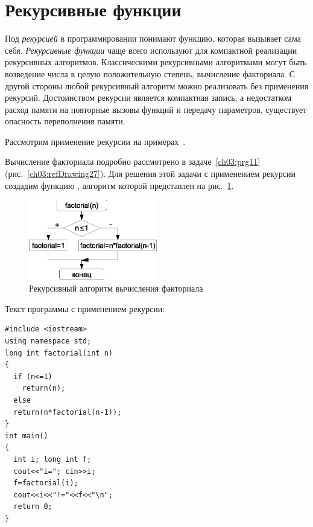 \section[Рекурсивные функции]{Рекурсивные функции}
Под \emph{рекурсией} в программировании понимают функцию, которая вызывает сама себя.
\emph{Рекурсивные функции} чаще всего используют для компактной реализации
рекурсивных алгоритмов. Классическими рекурсивными алгоритмами могут быть возведение числа в целую положительную
степень, вычисление факториала. С другой стороны любой рекурсивный алгоритм можно реализовать без применения рекурсий.
Достоинством рекурсии является компактная запись, а недостатком расход памяти на повторные вызовы функций и передачу
параметров, существует опасность переполнения памяти.

Рассмотрим применение рекурсии на примерах~\cite{C,Shim}. %


Вычисление факториала подробно рассмотрено в задаче~\ref{ch03:prg11} 
(рис.~\ref{ch03:refDrawing27}). Для решения этой задачи с применением рекурсии
создадим функцию , алгоритм которой представлен на рис.~\ref{ch04:refDrawing9}. 

\begin{figure}[htb]
\begin{center}
\includegraphics[width=0.5\textwidth]{img/ris_4_10}
\caption{Рекурсивный алгоритм вычисления факториала}
\label{ch04:refDrawing9}
\end{center}
\end{figure}


Текст программы с применением рекурсии:
\begin{lstlisting}
#include <iostream>
using namespace std;
long int factorial(int n)
{
  if (n<=1) 
    return(n); 
  else 
  return(n*factorial(n-1)); 
}
int main()
{
  int i; long int f;
  cout<<"i="; cin>>i;
  f=factorial(i); 
  cout<<i<<"!="<<f<<"\n"; 
  return 0;
}
\end{lstlisting}


